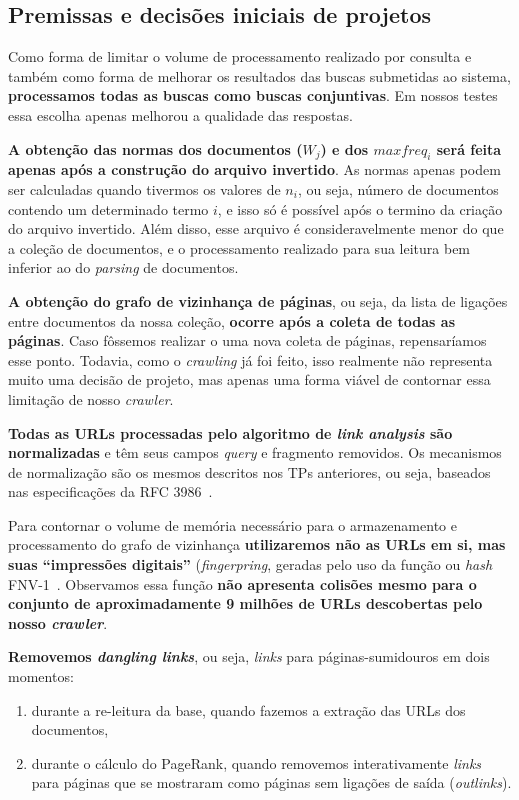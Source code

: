 \documentclass[10pt,twocolumn]{article}
\begin{document}
\subsection{Premissas e decisões iniciais de projetos}

Como forma de limitar o volume de processamento realizado por consulta e
também como forma de melhorar os resultados das buscas submetidas ao
sistema, \textbf{processamos todas as buscas como buscas conjuntivas}.
Em nossos testes essa escolha apenas melhorou a qualidade das respostas.

\textbf{A obtenção das normas dos documentos (\(W_j\)) e dos
\(maxfreq_i\) será feita apenas após a construção do arquivo invertido}.
As normas apenas podem ser calculadas quando tivermos os valores de
\(n_i\), ou seja, número de documentos contendo um determinado termo
\(i\), e isso só é possível após o termino da criação do arquivo
invertido. Além disso, esse arquivo é consideravelmente menor do que a
coleção de documentos, e o processamento realizado para sua leitura bem
inferior ao do \emph{parsing} de documentos.

\textbf{A obtenção do grafo de vizinhança de páginas}, ou seja, da lista de
ligações entre documentos da nossa coleção, \textbf{ocorre após a coleta de
todas as páginas}. Caso fôssemos realizar o uma nova coleta de páginas,
repensaríamos esse ponto. Todavia, como o \emph{crawling} já foi feito, isso
realmente não representa muito uma decisão de projeto, mas apenas uma
forma viável de contornar essa limitação de nosso \emph{crawler}.


\textbf{Todas as URLs processadas pelo algoritmo de \emph{link analysis} são
normalizadas} e têm seus campos \emph{query} e fragmento removidos. Os
mecanismos de normalização são os mesmos descritos nos TPs anteriores,
ou seja, baseados nas especificações da RFC 3986~\cite{rfc3986}.

Para contornar o volume de memória necessário para o armazenamento e
processamento do grafo de vizinhança \textbf{utilizaremos não as URLs em si, mas
suas ``impressões digitais''} (\emph{fingerpring}, geradas pelo uso da
função ou \emph{hash} FNV-1~\cite{fnv1}. Observamos essa função \textbf{não
apresenta colisões mesmo para o conjunto de aproximadamente 9 milhões de
URLs descobertas pelo nosso \emph{crawler}}.

\textbf{Removemos \emph{dangling links}}, ou seja, \emph{links} para
páginas-sumidouros em dois momentos:
\begin{enumerate}
\item durante a re-leitura da base, quando fazemos a extração das URLs
dos documentos,
\item durante o cálculo do PageRank, quando removemos interativamente
\emph{links} para páginas que se mostraram como páginas sem ligações de 
saída (\emph{outlinks}).
\end{enumerate}
\end{document}
